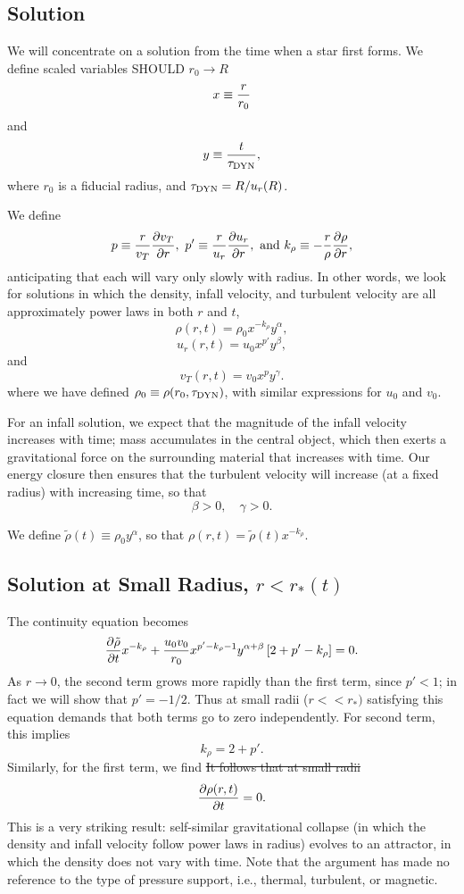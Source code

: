 \documentclass[iop,apj,numberedappendix]{emulateapj}
\newcommand       \phil[1]      {{\color{blue} #1}}
\newcommand       \be		{\begin{equation}}
\newcommand       \ee		{\end{equation}}
\newcommand       \tDyn         {\tau_{\rm DYN}}
\begin{document}


\subsection{Solution}
We will concentrate on a solution from the time when a star first
forms.  We define scaled variables
%
\phil{ SHOULD $r_0 \rightarrow R$}
\be %
x\equiv {r\over r_0}
\ee %
and
%
\be %
y\equiv{t\over\tDyn},
\ee %
%
where $r_0$ is a fiducial radius, and $\tDyn=R/u_r(R)$. 
%

We define
%
\be  %
p\equiv{r\over v_T}{\partial v_T\over \partial r},
\ p'\equiv{r\over u_r}{\partial u_r\over \partial r},\ {\rm and}
\ k_\rho\equiv-{r\over \rho}{\partial \rho\over \partial r},
\ee  %
%
anticipating that each will vary only slowly with radius. In other
words, we look for solutions in which the density, infall velocity,
and turbulent velocity are all approximately power laws in both $r$
and $t$,
%
\be %
\rho(r,t)=\rho_0x^{-k_\rho} y^\alpha,
\ee %
%
\be %
u_r(r,t)=u_0 x^{p'} y^\beta,
\ee %
%
and
%
\be %
v_T(r,t)=v_0 x^p y^\gamma.
\ee %
%
where we have defined $\rho_0\equiv\rho(r_0,\tDyn)$, with similar
expressions for $u_0$ and $v_0$.

For an infall solution, we expect that the magnitude of the infall
velocity increases with time; mass accumulates in the central object,
which then exerts a gravitational force on the surrounding material
that increases with time. Our energy closure then ensures that the
turbulent velocity will increase (at a fixed radius) with increasing
time, so that
%
\be %
\beta>0,\quad\gamma>0.
\ee %
%

We define $\tilde\rho(t)\equiv\rho_0 y^\alpha$, so that
$\rho(r,t)=\tilde\rho(t) x^{-k_\rho}$. 

\subsection{Solution at Small Radius, $r<r_*(t)$} \label{sec: inside}
The continuity equation becomes
% 
\be  \label{eqn: continuity below rstar}%
{\partial\tilde\rho\over\partial t} x^{-k_\rho}+{u_0v_0\over
  r_0}x^{p'-k_\rho-1}y^{\alpha+\beta}
\left[2+p'-k_\rho\right]=0.
\ee  %
%
As $r\to0$, the second term grows more rapidly than the first term,
since $p'<1$; in fact we will show that $p'=-1/2$. Thus at small radii
($r<<r_*)$ \phil{ satisfying this equation demands that both terms go to zero independently.  For second term, this implies}
%
\be \label{eqn: rho u}%
k_\rho=2+p'.
\ee %
%
\phil{Similarly, for the first term, we find \sout{
It follows that at small radii }}
% 
\be  \label{eqn: density attractor}%
{\partial \rho(r,t)\over \partial t}=0.
\ee  %
%
This is a very striking result: self-similar gravitational collapse
(in which the density and infall velocity follow power laws in radius)
evolves to an attractor, in which the density does not vary with
time. Note that the argument has made no reference to the type of
pressure support, i.e., thermal, turbulent, or magnetic.
\end{document}
